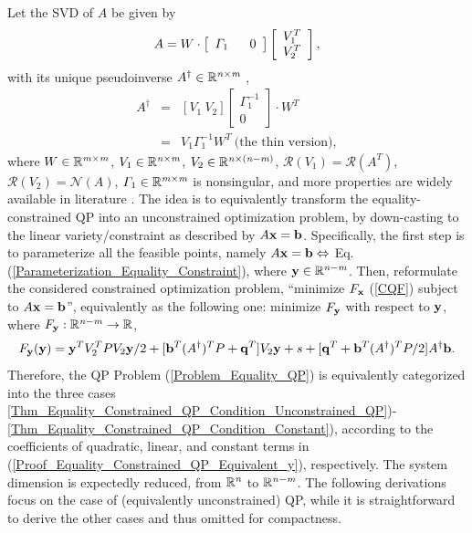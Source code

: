 \documentclass{imaman}
\newcommand{\beq}{\begin{eqnarray}}
\newcommand{\eeq}{\end{eqnarray}}
\newcommand{\bfb}{{\bf b}}
\newcommand{\bfx}{{\bf x}}
\newcommand{\bfq}{{\bf q}}
\newcommand{\bfy}{{\bf y}}
\newcommand{\real}{\mathbb{R}}
\newcommand{\calN}{{\mathcal N}}
\newcommand{\calR}{{\mathcal R}}
\newcommand{\itm}{{\it m}}
\newcommand{\itn}{{\it n}}
\numberwithin{equation}{section}
\begin{document}
Let the SVD of $A$ be given by
\beq
A=W\cdot\left[ \begin{array}{cc} \Gamma_1~~ & 0 \end{array}\right]\left[ \def\arraystretch{1}\begin{array}{c} V_1^T\\V_2^T\end{array}\right],\nonumber
\eeq
with its unique pseudoinverse $A^\dagger\in\real^{\itn\times\itm}$ \cite{GoVa:13},
\beq
A^\dagger&=&[V_1~V_2]\left[ \begin{array}{c} \Gamma_1^{-1}\\ 0 \end{array}\right]\cdot W^T\nonumber\\
&=&V_1\Gamma_1^{-1}W^T~\mbox{(the thin version)},
\label{App_Proof_Equality_Constrained_QP_A_dagger}
\eeq
where $W\in\real^{\itm\times\itm}$, $V_1\in\real^{\itn\times\itm}$, $V_2\in\real^{\itn\times(\itn-\itm)}$, $\calR(V_1)=\calR(A^T)$, $\calR(V_2)=\calN(A)$, $\Gamma_1\in\real^{\itm\times\itm}$ is nonsingular, and more properties are widely available in literature \cite{GoVa:13}. The idea is to equivalently transform the equality-constrained QP into an unconstrained optimization problem, by down-casting to the linear variety/constraint as described by $A\bfx=\bfb$. Specifically, the first step is to parameterize all the feasible points, namely $A\bfx=\bfb\Leftrightarrow$ Eq. (\ref{Parameterization_Equality_Constraint}), where $\bfy\in\real^{\itn-\itm}$. Then, reformulate the considered constrained optimization problem, ``minimize $F_\bfx$ (\ref{CQF}) subject to $A\bfx=\bfb$'', equivalently as the following one: minimize $F_\bfy$ with respect to $\bfy$, where $F_\bfy:\real^{\itn-\itm}\rightarrow\real$,
\beq
F_\bfy(\bfy)=\bfy^TV_2^TPV_2\bfy/2+[\bfb^T(A^\dagger)^TP+\bfq^T]V_2\bfy+s+[\bfq^T+\bfb^T(A^\dagger)^TP/2]A^\dagger\bfb.
\label{Proof_Equality_Constrained_QP_Equivalent_y}
\eeq
Therefore, the QP Problem (\ref{Problem_Equality_QP}) is equivalently categorized into the three cases \ref{Thm_Equality_Constrained_QP_Condition_Unconstrained_QP})-\ref{Thm_Equality_Constrained_QP_Condition_Constant}), according to the coefficients of quadratic, linear, and constant terms in (\ref{Proof_Equality_Constrained_QP_Equivalent_y}), respectively. The system dimension is expectedly reduced, from $\real^\itn$ to $\real^{\itn-\itm}$. The following derivations focus on the case of (equivalently unconstrained) QP, while it is straightforward to derive the other cases and thus omitted for compactness.
\end{document}
